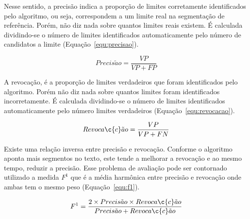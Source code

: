 % 
Nesse sentido, a precisão indica a proporção de limites corretamente identificados pelo algoritmo, ou seja, correspondem a um limite real na segmentação de referência. 
Porém, não diz nada sobre quantos limites reais existem. 
É calculada dividindo-se o número de limites identificados automaticamente pelo número de candidatos a limite (Equação~\ref{equ:precisao}).
 
 \begin{equation}
	 Precis\tilde{a}o = \frac{VP}{VP+FP}
	 \label{equ:precisao}
 \end{equation}

%
 A revocação, é a proporção de limites verdadeiros que foram identificados pelo algoritmo. Porém não diz nada sobre quantos limites foram identificados incorretamente. É calculada dividindo-se o número de limites identificados automaticamente pelo número limites verdadeiros (Equação~\ref{equ:revocacao}).
 
 \begin{equation}
	 Revoca\c{c}\tilde{a}o = \frac{VP}{VP+FN}
	 \label{equ:revocacao}
 \end{equation}

 Existe uma relação inversa entre precisão e revocação. Conforme o algoritmo aponta mais segmentos no texto, este tende a melhorar a revocação e ao mesmo tempo, reduzir a precisão. Esse problema de avaliação pode ser contornado utilizado a medida $F^1$ que é a média harmônica entre precisão e revocação onde ambas tem o mesmo peso (Equação~\ref{equ:f1}). 

 \begin{equation}
	 F^1 = \frac{2 \times Precis\tilde{a}o \times Revoca\c{c}\tilde{a}o}
		        {Precis\tilde{a}o + Revoca\c{c}\tilde{a}o}
	 \label{equ:f1}
 \end{equation}





























